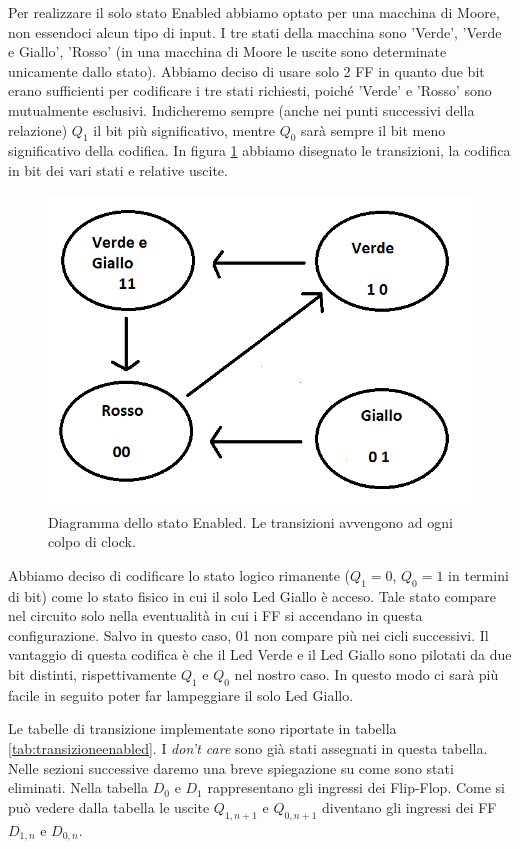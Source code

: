 \documentclass[10pt,a4paper]{article}
\begin{document}
Per realizzare il solo stato Enabled abbiamo optato per una macchina di Moore, non essendoci alcun tipo di input. I tre stati della macchina sono 'Verde', 'Verde e Giallo', 'Rosso' (in una macchina di Moore le uscite sono determinate unicamente dallo stato). Abbiamo deciso di usare solo 2 FF in quanto due bit erano sufficienti per codificare i tre stati richiesti, poiché 'Verde' e 'Rosso' sono mutualmente esclusivi. Indicheremo sempre (anche nei punti successivi della relazione) $Q_1$ il bit più significativo, mentre $Q_0$ sarà sempre il bit meno significativo della codifica. In figura \ref{fig:FSMenabled} abbiamo disegnato le transizioni, la codifica in bit dei vari stati e relative uscite.
\begin{figure}[!htb]
\centering
\includegraphics[scale=0.7]{FSMenabled.png}
\caption{Diagramma dello stato Enabled. Le transizioni avvengono ad ogni colpo di clock.\label{fig:FSMenabled}}
\end{figure}
Abbiamo deciso di codificare lo stato logico rimanente ($Q_1 = 0$, $Q_0 = 1$ in termini di bit) come lo stato fisico in cui il solo Led Giallo è acceso. Tale stato compare nel circuito solo nella eventualità in cui i FF si accendano in questa configurazione. Salvo in questo caso, 01 non compare più nei cicli successivi.
Il vantaggio di questa codifica è che il Led Verde e il Led Giallo sono pilotati da due bit distinti, rispettivamente $Q_1$ e $Q_0$ nel nostro caso. In questo modo ci sarà più facile in seguito poter far lampeggiare il solo Led Giallo.

Le tabelle di transizione implementate sono riportate in tabella \ref{tab:transizioneenabled}. I \emph{don't care} sono già stati assegnati in questa tabella. Nelle sezioni successive daremo una breve spiegazione su come sono stati eliminati. Nella tabella $D_0$ e $D_1$ rappresentano gli ingressi dei Flip-Flop. Come si può vedere dalla tabella le uscite $Q_{1,n+1}$ e $Q_{0,n+1}$ diventano gli ingressi dei FF $D_{1, n}$ e $D_{0, n}$.
\end{document}
